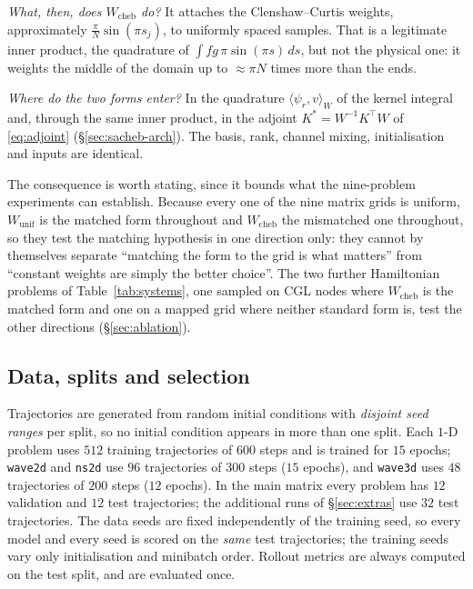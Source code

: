 \documentclass[11pt]{article}
\theoremstyle{definition}
\theoremstyle{remark}
\newcommand{\iprod}[2]{\langle #1, #2 \rangle}
\newcommand{\Wc}{W_{\mathrm{cheb}}}
\newcommand{\Wu}{W_{\mathrm{unif}}}
\begin{document}
\emph{What, then, does $\Wc$ do?} It attaches the Clenshaw--Curtis weights,
approximately $\frac{\pi}{N}\sin(\pi s_j)$, to uniformly spaced samples. That is
a legitimate inner product, the quadrature of $\int fg\,\pi\sin(\pi s)\,ds$, but
not the physical one: it weights the middle of the domain up to $\approx\pi N$
times more than the ends.

\emph{Where do the two forms enter?} In the quadrature $\iprod{\psi_r}{v}_W$ of the
kernel integral and, through the same inner product, in the adjoint
$K^{*}=W^{-1}K^{\top}W$ of \eqref{eq:adjoint} (\S\ref{sec:sacheb-arch}). The basis,
rank, channel mixing, initialisation and inputs are identical.

The consequence is worth stating, since it bounds what the nine-problem
experiments can establish. Because every one of the nine matrix grids is uniform, $\Wu$ is
the matched form throughout and $\Wc$ the mismatched one throughout, so they
test the matching hypothesis in one direction only: they cannot by themselves
separate ``matching the form to the grid is what matters'' from ``constant
weights are simply the better choice''. The two further Hamiltonian problems
of Table~\ref{tab:systems}, one sampled on CGL nodes where $\Wc$ is the matched
form and one on a mapped grid where neither standard form is, test the other
directions (\S\ref{sec:ablation}).

\subsection{Data, splits and selection}
\label{sec:splits}

Trajectories are generated from random initial conditions with \emph{disjoint
seed ranges} per split, so no initial condition appears in more than one split.
Each $1$-D problem uses $512$ training trajectories of $600$ steps and is trained
for $15$ epochs; \texttt{wave2d} and \texttt{ns2d} use $96$ trajectories of $300$
steps ($15$ epochs), and \texttt{wave3d} uses $48$ trajectories of $200$ steps
($12$ epochs). In the main matrix every problem has $12$ validation and $12$ test
trajectories; the additional runs of \S\ref{sec:extras} use $32$ test
trajectories.
The data seeds are fixed independently of the training seed, so every model and
every seed is scored on the \emph{same} test trajectories; the training seeds vary
only initialisation and minibatch order. Rollout metrics are always computed on
the test split, and are evaluated once.
\end{document}
